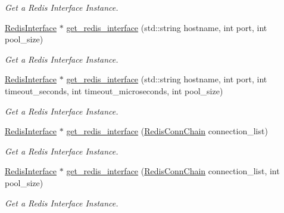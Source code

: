 \begin{DoxyCompactItemize}
\begin{DoxyCompactList}\small\item\em Get a Redis Interface Instance. \end{DoxyCompactList}\item 
\hyperlink{classRedisInterface}{Redis\+Interface} $\ast$ \hyperlink{classRedisComponentFactory_a92f73527a54437cf08743d2912905ead}{get\+\_\+redis\+\_\+interface} (std\+::string hostname, int port, int pool\+\_\+size)\hypertarget{classRedisComponentFactory_a92f73527a54437cf08743d2912905ead}{}\label{classRedisComponentFactory_a92f73527a54437cf08743d2912905ead}

\begin{DoxyCompactList}\small\item\em Get a Redis Interface Instance. \end{DoxyCompactList}\item 
\hyperlink{classRedisInterface}{Redis\+Interface} $\ast$ \hyperlink{classRedisComponentFactory_a5d57cf70da6c5420b419a9921ff60d8d}{get\+\_\+redis\+\_\+interface} (std\+::string hostname, int port, int timeout\+\_\+seconds, int timeout\+\_\+microseconds, int pool\+\_\+size)\hypertarget{classRedisComponentFactory_a5d57cf70da6c5420b419a9921ff60d8d}{}\label{classRedisComponentFactory_a5d57cf70da6c5420b419a9921ff60d8d}

\begin{DoxyCompactList}\small\item\em Get a Redis Interface Instance. \end{DoxyCompactList}\item 
\hyperlink{classRedisInterface}{Redis\+Interface} $\ast$ \hyperlink{classRedisComponentFactory_ad4339f7c25961aa218f41dcd4bb09003}{get\+\_\+redis\+\_\+interface} (\hyperlink{structRedisConnChain}{Redis\+Conn\+Chain} connection\+\_\+list)\hypertarget{classRedisComponentFactory_ad4339f7c25961aa218f41dcd4bb09003}{}\label{classRedisComponentFactory_ad4339f7c25961aa218f41dcd4bb09003}

\begin{DoxyCompactList}\small\item\em Get a Redis Interface Instance. \end{DoxyCompactList}\item 
\hyperlink{classRedisInterface}{Redis\+Interface} $\ast$ \hyperlink{classRedisComponentFactory_a255dea42505a6902420dae023c918554}{get\+\_\+redis\+\_\+interface} (\hyperlink{structRedisConnChain}{Redis\+Conn\+Chain} connection\+\_\+list, int pool\+\_\+size)\hypertarget{classRedisComponentFactory_a255dea42505a6902420dae023c918554}{}\label{classRedisComponentFactory_a255dea42505a6902420dae023c918554}

\begin{DoxyCompactList}\small\item\em Get a Redis Interface Instance. \end{DoxyCompactList}\end{DoxyCompactItemize}


